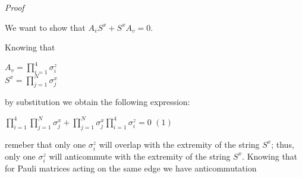 \documentclass[12pt]{report}
\begin{document}
\begin{minipage}{1 \textwidth}
		\textit{Proof}\newline 
		
		We want to show that $A_v S^x + S^x A_v=0$.\newline
		
		Knowing that 
		
		\begin{center}
			$A_v = \prod_{i=1}^{4} \sigma_i^z$ \\ 
			$S^x = \prod_{j=1}^{N} \sigma_j^x$
		\end{center}
		
		by substitution we obtain the following expression: \newline
		
		\begin{center}
			$\prod_{i=1}^{4} \prod_{j=1}^{N} \sigma_j^x + \prod_{j=1}^{N} \sigma_j^x \prod_{i=1}^{4} \sigma_i^z = 0$ $(1)$
		\end{center}
		
		remeber that only one $\sigma_i^z$ will overlap with the extremity of the string $S^x$; thus, only one $\sigma_i^z$ will anticommute with the extremity of the string $S^x$. Knowing that for Pauli matrices acting on the same edge we have anticommutation
		
		
		
	\end{minipage}
	
\end{document}
